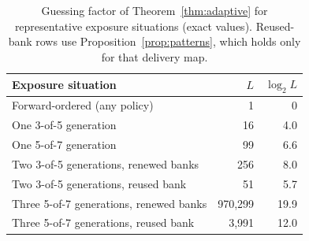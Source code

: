 \documentclass[pdflatex,sn-mathphys-num,twocolumn]{sn-jnl}
\theoremstyle{plain}
\theoremstyle{definition}
\begin{document}
\begin{table}[htbp]
\caption{Guessing factor of Theorem~\ref{thm:adaptive} for representative exposure situations (exact values). Reused-bank rows use Proposition~\ref{prop:patterns}, which holds only for that delivery map.}\label{tab:guess}
\centering\footnotesize
\begin{tabularx}{\linewidth}{@{}>{\raggedright\arraybackslash}Xrr@{}}\toprule
Exposure situation & $L$ & $\log_2L$\\\midrule
Forward-ordered (any policy) & 1 & 0\\
One 3-of-5 generation & 16 & 4.0\\
One 5-of-7 generation & 99 & 6.6\\
Two 3-of-5 generations, renewed banks & 256 & 8.0\\
Two 3-of-5 generations, reused bank & 51 & 5.7\\
Three 5-of-7 generations, renewed banks & 970,299 & 19.9\\
Three 5-of-7 generations, reused bank & 3,991 & 12.0\\\bottomrule
\end{tabularx}
\end{table}
\end{document}
